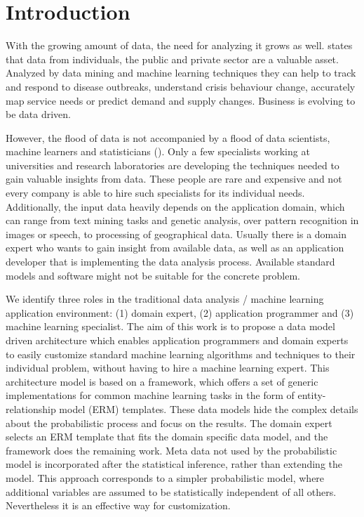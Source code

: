 \section{Introduction}

With the growing amount of data, the need for analyzing it grows as well. \textcite{forum2012bigdata} states that data from individuals, the public and private sector are a valuable asset. Analyzed by data mining and machine learning techniques they can help to track and respond to disease outbreaks, understand crisis behaviour change, accurately map service needs or predict demand and supply changes. Business is evolving to be data driven.

However, the flood of data is not accompanied by a flood of data scientists, machine learners and statisticians (\cite{davenport2012data}). Only a few specialists working at universities and research laboratories are developing the techniques needed to gain valuable insights from data. These people are rare and expensive and not every company is able to hire such specialists for its individual needs. Additionally, the input data heavily depends on the application domain, which can range from text mining tasks and genetic analysis, over pattern recognition in images or speech, to processing of geographical data. Usually there is a domain expert who wants to gain insight from available data, as well as an application developer that is implementing the data analysis process. Available standard models and software might not be suitable for the concrete problem.

We identify three roles in the traditional data analysis / machine learning application environment: (1) domain expert, (2) application programmer and (3) machine learning specialist. The aim of this work is to propose a data model driven architecture which enables application programmers and domain experts to easily customize standard machine learning algorithms and techniques to their individual problem, without having to hire a machine learning expert. This architecture model is based on a framework, which offers a set of generic implementations for common machine learning tasks in the form of entity-relationship model (ERM) templates. These data models hide the complex details about the probabilistic process and focus on the results. The domain expert selects an ERM template that fits the domain specific data model, and the framework does the remaining work. Meta data not used by the probabilistic model is incorporated after the statistical inference, rather than extending the model. This approach corresponds to a simpler probabilistic model, where additional variables are assumed to be statistically independent of all others. Nevertheless it is an effective way for customization.


